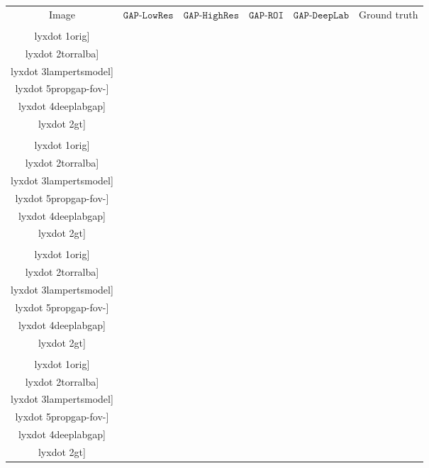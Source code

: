 \documentclass[british,10pt,twocolumn,letterpaper]{article}
\providecommand{\tabularnewline}{\\}
\newcommand{\lyxdot}{.}
\begin{document}
\begin{figure*}
\begin{centering}
\begin{tabular}{cccccc}


Image & $\mathtt{GAP}\text{-}\mathtt{LowRes}$ &  $\mathtt{GAP}\text{-}\mathtt{HighRes}$ &  $\mathtt{GAP}\text{-}\mathtt{ROI}$ &  $\mathtt{GAP}\text{-}\mathtt{DeepLab}$ & Ground truth\tabularnewline
\texttt{[image: figures/seed-random-examples/2007\_003872\\lyxdot 1orig]} & \texttt{[image: figures/seed-random-examples/2007\_003872\\lyxdot 2torralba]} & \texttt{[image: figures/seed-random-examples/2007\_003872\\lyxdot 3lampertsmodel]} & \texttt{[image: figures/seed-random-examples/2007\_003872\\lyxdot 5propgap-fov-]} & \texttt{[image: figures/seed-random-examples/2007\_003872\\lyxdot 4deeplabgap]} & \texttt{[image: figures/seed-random-examples/2007\_003872\\lyxdot 2gt]}\tabularnewline
\texttt{[image: figures/seed-random-examples/2007\_009458\\lyxdot 1orig]} & \texttt{[image: figures/seed-random-examples/2007\_009458\\lyxdot 2torralba]} & \texttt{[image: figures/seed-random-examples/2007\_009458\\lyxdot 3lampertsmodel]} & \texttt{[image: figures/seed-random-examples/2007\_009458\\lyxdot 5propgap-fov-]} & \texttt{[image: figures/seed-random-examples/2007\_009458\\lyxdot 4deeplabgap]} & \texttt{[image: figures/seed-random-examples/2007\_009458\\lyxdot 2gt]}\tabularnewline
\texttt{[image: figures/seed-random-examples/2008\_000391\\lyxdot 1orig]} & \texttt{[image: figures/seed-random-examples/2008\_000391\\lyxdot 2torralba]} & \texttt{[image: figures/seed-random-examples/2008\_000391\\lyxdot 3lampertsmodel]} & \texttt{[image: figures/seed-random-examples/2008\_000391\\lyxdot 5propgap-fov-]} & \texttt{[image: figures/seed-random-examples/2008\_000391\\lyxdot 4deeplabgap]} & \texttt{[image: figures/seed-random-examples/2008\_000391\\lyxdot 2gt]}\tabularnewline
\texttt{[image: figures/seed-random-examples/2008\_005691\\lyxdot 1orig]} & \texttt{[image: figures/seed-random-examples/2008\_005691\\lyxdot 2torralba]} & \texttt{[image: figures/seed-random-examples/2008\_005691\\lyxdot 3lampertsmodel]} & \texttt{[image: figures/seed-random-examples/2008\_005691\\lyxdot 5propgap-fov-]} & \texttt{[image: figures/seed-random-examples/2008\_005691\\lyxdot 4deeplabgap]} & \texttt{[image: figures/seed-random-examples/2008\_005691\\lyxdot 2gt]}\tabularnewline

\end{tabular}
\end{centering}
\end{figure*}
\end{document}
